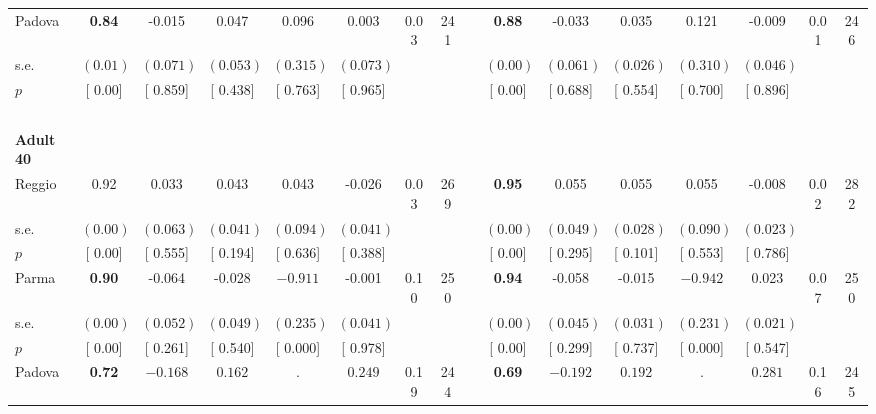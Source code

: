 \begin{longtable}{L{8em} c c c c c c c p{1em} c c c c c c c}
\quad \quad \quad Padova& \textbf{     0.84} &    -0.015 &     0.047 &     0.096 &     0.003 &      0.03 &       241 & & \textbf{     0.88} &    -0.033 &     0.035 &     0.121 &    -0.009 &      0.01 &       246  \\*
\quad \quad \quad \quad s.e.& $ (     0.01)$ & $ (    0.071)$ & $ (    0.053)$ & $ (    0.315)$ & $ (    0.073)$ & & & & $ (     0.00)$ & $ (    0.061)$ & $ (    0.026)$ & $ (    0.310)$ & $ (    0.046)$ & &  \\*
\quad \quad \quad \quad $ p$ & [     0.00] & [    0.859] & [    0.438] & [    0.763] & [    0.965] & & & & [     0.00] & [    0.688] & [    0.554] & [    0.700] & [    0.896] & &  \\[1em]
~\\[1em]
\quad \quad \textbf{Adult 40} & & & & & & & & & & & & & & & \\* 
\quad \quad \quad Reggio& 0.92 &     0.033 &     0.043 &     0.043 &    -0.026 &      0.03 &       269 & & \textbf{     0.95} &     0.055 &     0.055 &     0.055 &    -0.008 &      0.02 &       282  \\*
\quad \quad \quad \quad s.e.& $ (     0.00)$ & $ (    0.063)$ & $ (    0.041)$ & $ (    0.094)$ & $ (    0.041)$ & & & & $ (     0.00)$ & $ (    0.049)$ & $ (    0.028)$ & $ (    0.090)$ & $ (    0.023)$ & &  \\*
\quad \quad \quad \quad $ p$ & [     0.00] & [    0.555] & [    0.194] & [    0.636] & [    0.388] & & & & [     0.00] & [    0.295] & [    0.101] & [    0.553] & [    0.786] & &  \\[1em]
\quad \quad \quad Parma& \textbf{     0.90} &    -0.064 &    -0.028 & $ \mathbf{   -0.911}$ &    -0.001 &      0.10 &       250 & & \textbf{     0.94} &    -0.058 &    -0.015 & $ \mathbf{   -0.942}$ &     0.023 &      0.07 &       250  \\*
\quad \quad \quad \quad s.e.& $ (     0.00)$ & $ (    0.052)$ & $ (    0.049)$ & $ (    0.235)$ & $ (    0.041)$ & & & & $ (     0.00)$ & $ (    0.045)$ & $ (    0.031)$ & $ (    0.231)$ & $ (    0.021)$ & &  \\*
\quad \quad \quad \quad $ p$ & [     0.00] & [    0.261] & [    0.540] & [    0.000] & [    0.978] & & & & [     0.00] & [    0.299] & [    0.737] & [    0.000] & [    0.547] & &  \\[1em]
\quad \quad \quad Padova& \textbf{     0.72} & $ \mathbf{   -0.168}$ & $ \mathbf{    0.162}$ &         . & $ \mathbf{    0.249}$ &      0.19 &       244 & & \textbf{     0.69} & $ \mathbf{   -0.192}$ & $ \mathbf{    0.192}$ &         . & $ \mathbf{    0.281}$ &      0.16 &       245  \\*

\end{longtable}
